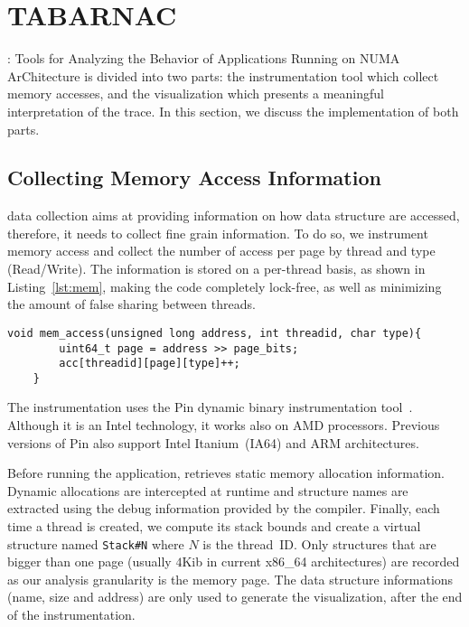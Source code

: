 \section{TABARNAC}
\label{sec:design}

\TABARNAC: Tools for Analyzing the Behavior of Applications Running on NUMA
ArChitecture is divided into two parts: the instrumentation tool which collect
memory accesses, and the visualization which presents a meaningful
interpretation of the trace.
In this section, we discuss the implementation of both parts.

\subsection{Collecting Memory Access Information}
\label{sec:design-impl}

\TABARNAC data collection aims at providing information on how data structure
are accessed, therefore, it needs to collect fine grain information. To do so,
we instrument memory access and collect the number of access per page by thread
and type (Read/Write). The information is stored on a per-thread basis, as
shown in Listing~\ref{lst:mem}, making the code completely lock-free, as well
as minimizing the amount of false sharing between threads.

\begin{lstlisting}[caption={Code executed on each memory access. Pin provides the \texttt{address}, \texttt{threadid} and \texttt{type} parameters.},label=lst:mem]
	void mem_access(unsigned long address, int threadid, char type){
		uint64_t page = address >> page_bits;
		acc[threadid][page][type]++;
	}
\end{lstlisting}

The instrumentation uses the Pin dynamic binary instrumentation
tool~\cite{Luk05Pin}. Although it is an Intel technology, it works also on AMD
processors.
Previous versions of Pin also support Intel Itanium~(IA64) and ARM architectures.

Before running the application, \TABARNAC retrieves static memory allocation
information. %
Dynamic allocations are intercepted at runtime and structure names
are extracted using the debug information provided by the compiler.
Finally, each time a thread is created, we compute its
stack bounds and create a virtual structure named \texttt{Stack\#N} where
$N$ is the thread~ID. Only structures that are bigger than one page (usually
$4$Kib in current x86\_64 architectures) are recorded as our
analysis granularity is the memory page. The data structure informations (name,
size and address) are only used to generate the visualization, after the end
of the instrumentation.


